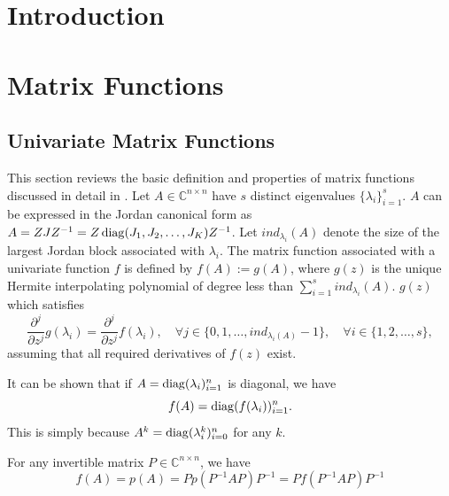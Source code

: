 \section{Introduction}


\newpage
\section{Matrix Functions}

\subsection{Univariate Matrix Functions}
This section reviews the basic definition and properties of matrix functions
discussed in detail in \cite{higham2008functions}.
Let $A \in \mathbb{C}^{n \times n}$ have $s$ distinct eigenvalues $\{\lambda_i\}_{i=1}^{s}$.
$A$ can be expressed in the Jordan canonical form as $A = ZJZ^{-1} = Z \operatorname{diag}(J_1, J_2, \dots, J_K)
Z^{-1}$. Let $ind_{\lambda_i}(A)$ denote the size of the largest Jordan block associated
with $\lambda_i$. The matrix function associated with a univariate function $f$
is defined by $f(A) := g(A)$, where $g(z)$ is the unique Hermite interpolating
polynomial of degree less than $\sum_{i=1}^{s}{ind_{\lambda_i}(A)}$. $g(z)$ which
satisfies
\begin{equation}
    \frac{\partial^j}{\partial z^j}g(\lambda_i) = \frac{\partial^j}{\partial z^j}f(\lambda_i),
    \quad \forall j \in \{0, 1, \dots, ind_{\lambda_i(A)}-1\},
    \quad \forall i \in \{1, 2, \dots, s\},
\end{equation}
assuming that all required derivatives of $f(z)$ exist.

It can be shown that if $A = \operatorname{diag}(\lambda_i)_{i=1}^{n}$ is diagonal, we have
\begin{equation}
    \label{eq:matrixfunctiondiagonal}
    f(A) = \operatorname{diag}(f(\lambda_i))_{i=1}^{n}.
\end{equation}
This is simply because $A^k = \operatorname{diag}(\lambda_i^k)_{i=0}^{n}$ for any $k$.

For any invertible matrix $P \in \mathbb{C}^{n \times n}$, we have
\begin{equation}
    \label{eq:matrixfunctioninvertible}
    f(A) = p(A) = Pp(P^{-1}AP)P^{-1} = Pf(P^{-1}AP)P^{-1}
\end{equation}


